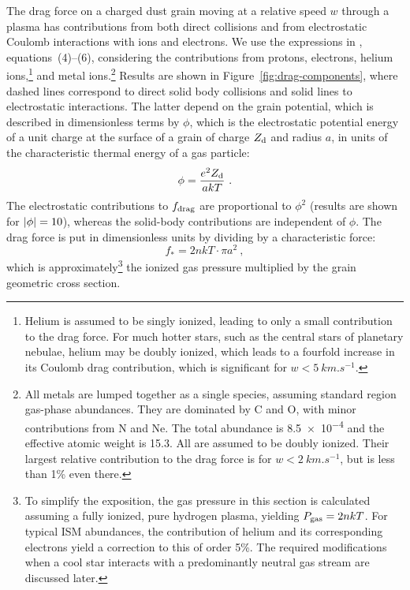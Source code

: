 The drag force on a charged dust grain moving at a relative speed
\(w\) through a plasma has contributions from both direct collisions
and from electrostatic Coulomb interactions with ions and electrons.
We use the expressions in \citet{Draine:1979a}, equations~(4)--(6),
considering the contributions from protons, electrons, helium
ions,\footnote{Helium is assumed to be singly ionized, leading to only
  a small contribution to the drag force.  For much hotter stars, such
  as the central stars of planetary nebulae, helium may be doubly
  ionized, which leads to a fourfold increase in its Coulomb drag
  contribution, which is significant for \(w < \SI{5}{km.s^{-1}}\).} %
and metal ions.\footnote{%
  \label{fn:metal-drag}
  All metals are lumped together as a single species, assuming
  standard \hii{} region gas-phase abundances.  They are dominated by
  C and O, with minor contributions from N and Ne.  The total
  abundance is \num{8.5e-4} and the effective atomic weight is
  \num{15.3}.  All are assumed to be doubly ionized.  Their largest
  relative contribution to the drag force is for
  \(w < \SI{2}{km.s^{-1}}\), but is less than 1\% even there.} %
Results are shown in Figure~\ref{fig:drag-components}, where dashed lines correspond to direct solid body collisions and solid lines to electrostatic interactions.  The latter depend on the grain potential, which is described in dimensionless terms by \(\phi\), which is the electrostatic potential
energy of a unit charge at the surface of a grain of charge
\(Z_{\text{d}}\) and radius \(a\), in units of the characteristic thermal
energy of a gas particle:
\begin{equation}
  \label{eq:phi-potential}
  \phi = \frac{e^2 Z_{\text{d}}}{a kT} \ .
\end{equation}
The electrostatic contributions to \(f_{\text{drag}}\) are proportional to
\(\phi^2\) (results are shown for \(\lvert\phi\rvert = 10\)), whereas the
solid-body contributions are independent of \(\phi\).  The drag force is
put in dimensionless units by dividing by a characteristic force:
\begin{equation}
  \label{eq:fstar}
  f_* = 2 n k T \cdot \pi a^2 \ , 
\end{equation}
which is approximately\footnote{%
  To simplify the exposition, the gas pressure in this section is
  calculated assuming a fully ionized, pure hydrogen plasma, yielding
  \(P_{\text{gas}} = 2 n k T\). For typical ISM abundances, the contribution of
  helium and its corresponding electrons yield a correction to this of
  order 5\%.  The required modifications when a cool star interacts
  with a predominantly neutral gas stream are discussed later.  } %
the ionized gas pressure multiplied by the grain geometric cross
section.

